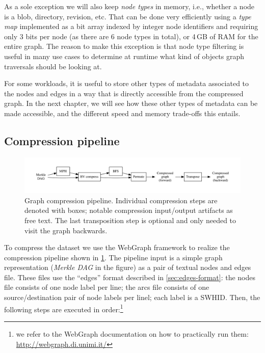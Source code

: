 As a sole exception we will also keep \emph{node types} in memory, i.e., whether
a node is a blob, directory, revision, etc. That can be done very
efficiently using a \emph{type map} implemented as a bit array indexed by
integer node identifiers and requiring only 3 bits per node (as there are 6
node types in total), or 4\,GB of RAM for the entire graph. The reason to make
this exception is that node type filtering is useful in many use cases to
determine at runtime what kind of objects graph traversals should be looking
at.

For some workloads, it is useful to store other types of metadata associated to
the nodes and edges in a way that is directly accessible from the compressed
graph.
In the next chapter, we will see how these other types of metadata can be made
accessible, and the different speed and memory trade-offs this entails.

\subsection{Compression pipeline}%
\label{sec:compression-pipeline}

\begin{figure}
  \centering
  \includegraphics[width=\linewidth,trim=1cm 1cm 1cm 1cm]{img/compression/compression_steps-nofiles}
  \caption{Graph compression pipeline. Individual compression steps are denoted
    with boxes; notable compression input/output artifacts as free text. The
    last transposition step is optional and only needed to visit the graph
    backwards.}%
  \label{fig:compression-pipeline}
\end{figure}

To compress the dataset we use the WebGraph framework to realize the
compression pipeline shown in \cref{fig:compression-pipeline}. The
pipeline input is a simple graph representation (\emph{Merkle DAG} in the
figure) as a pair of textual nodes and edges file. These files use the
``edges'' format described in \cref{sec:edges-format}: the nodes file
consists of one node label per line; the arcs file consists of one
source/destination pair of node labels per linel; each label is a \gls{SWHID}.
Then, the following steps are executed in order:\footnote{we refer to the
WebGraph documentation on how to practically run them:
\url{http://webgraph.di.unimi.it/}}

